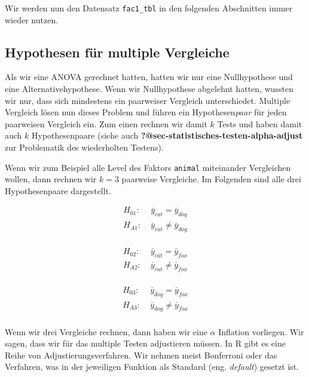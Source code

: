 \documentclass[
  letterpaper,
  DIV=11,
  oneside]{scrreport}
\begin{document}
Wir werden nun den Datensatz \texttt{fac1\_tbl} in den folgenden
Abschnitten immer wieder nutzen.

\hypertarget{hypothesen-fuxfcr-multiple-vergleiche}{%
\subsection{Hypothesen für multiple
Vergleiche}\label{hypothesen-fuxfcr-multiple-vergleiche}}

Als wir eine ANOVA gerechnet hatten, hatten wir nur eine Nullhypothese
und eine Alternativehypothese. Wenn wir Nullhypothese abgelehnt hatten,
wussten wir nur, dass sich mindestens ein paarweiser Vergleich
unterschiedet. Multiple Vergleich lösen nun dieses Problem und führen
ein Hypothesen\emph{paar} für jeden paarweisen Vergleich ein. Zum einen
rechnen wir damit \(k\) Tests und haben damit auch \(k\) Hypothesenpaare
(siehe auch \textbf{?@sec-statistisches-testen-alpha-adjust} zur
Problematik des wiederholten Testens).

Wenn wir zum Beispiel alle Level des Faktors \texttt{animal} miteinander
Vergleichen wollen, dann rechnen wir \(k=3\) paarweise Vergleiche. Im
Folgenden sind alle drei Hypothesenpaare dargestellt.

\begin{align*}
H_{01}: &\; \bar{y}_{cat} = \bar{y}_{dog}\\
H_{A1}: &\; \bar{y}_{cat} \ne \bar{y}_{dog}\\
\end{align*}

\begin{align*}
H_{02}: &\; \bar{y}_{cat} = \bar{y}_{fox}\\
H_{A2}: &\; \bar{y}_{cat} \ne \bar{y}_{fox}\\
\end{align*}

\begin{align*}
H_{03}: &\; \bar{y}_{dog} = \bar{y}_{fox}\\
H_{A3}: &\; \bar{y}_{dog} \ne \bar{y}_{fox}\\
\end{align*}

Wenn wir drei Vergleiche rechnen, dann haben wir eine \(\alpha\)
Inflation vorliegen. Wir sagen, dass wir für das multiple Testen
adjustieren müssen. In R gibt es eine Reihe von Adjustierungsverfahren.
Wir nehmen meist Bonferroni oder das Verfahren, was in der jeweiligen
Funktion als Standard (eng. \emph{default}) gesetzt ist.
\end{document}
